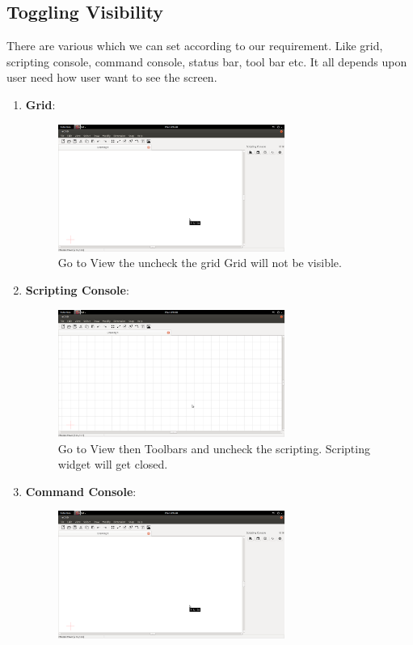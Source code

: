 \subsection{Toggling Visibility}
There are various which we can set according to our requirement. Like grid, scripting console, command console, status bar, tool bar etc. It all depends upon user need how user want to see the screen. 
\begin{enumerate}
\item \textbf{Grid}:
\begin{figure}[h!]
\centering
\includegraphics[width=0.7\textwidth]{images/togglegrig.png}\\
Go to View the uncheck the grid Grid will not be visible.
\end{figure}
\newpage
\item \textbf{Scripting Console}:
\begin{figure}[h!]
\centering
\includegraphics[width=0.7\textwidth]{images/togglescripting.png}\\
Go to View then Toolbars and uncheck the scripting. Scripting widget will get closed.
\end{figure}
\item \textbf{Command Console}:
\begin{figure}[h!]
\centering
\includegraphics[width=0.7\textwidth]{images/togglegrig.png}\\

\end{figure}
\end{enumerate}
